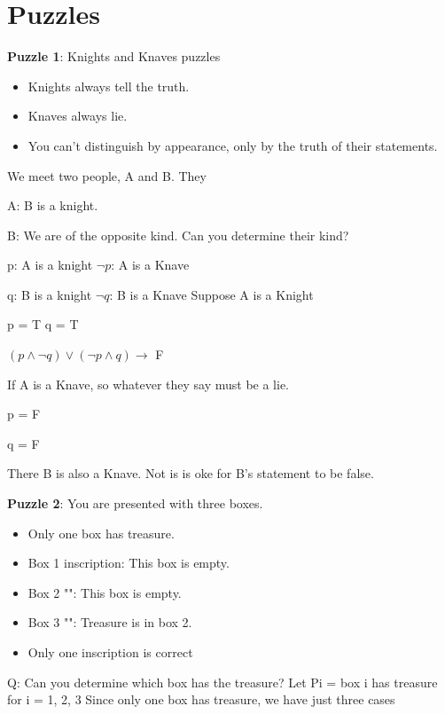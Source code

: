 \documentclass{article}
\begin{document}
\section{Puzzles}
\textbf{Puzzle 1}: Knights and Knaves puzzles
\begin{itemize}
    \item Knights always tell the truth.
    \item Knaves always lie.
    \item You can't distinguish by appearance, only by the truth of their statements.
\end{itemize}

\hfill \break
We meet two people, A and B. They

A: B is a knight.

B: We are of the opposite kind.
\hfill \break
Can you determine their kind?

p: A is a knight \hspace{5mm} $\lnot p$: A is a Knave

q: B is a knight \hspace{5mm} $\lnot q$: B is a Knave
\hfill \break
Suppose A is a Knight

p = T \hspace{2.5mm} q = T

$(p\land \lnot q)\lor (\lnot p \land q) \rightarrow$ F

\hfill \break
If A is a Knave, so whatever they say must be a lie.

p = F

q = F

\hfill \break
There B is also a Knave.
\hfill \break
Not is is oke for B's statement to be false.

\hfill \break
\textbf{Puzzle 2}: You are presented with three boxes.
\begin{itemize}
    \item Only one box has treasure.
    \item Box 1 inscription: This box is empty.
    \item Box 2 "\hspace{3mm}": This box is empty.
    \item Box 3 "\hspace{3mm}": Treasure is in box 2.
    \item Only one inscription is correct
\end{itemize}
Q: Can you determine which box has the treasure?
\hfill \break
Let Pi = box i has treasure for i = 1, 2, 3
\hfill \break
Since only one box has treasure, we have just three cases 
\end{document}
